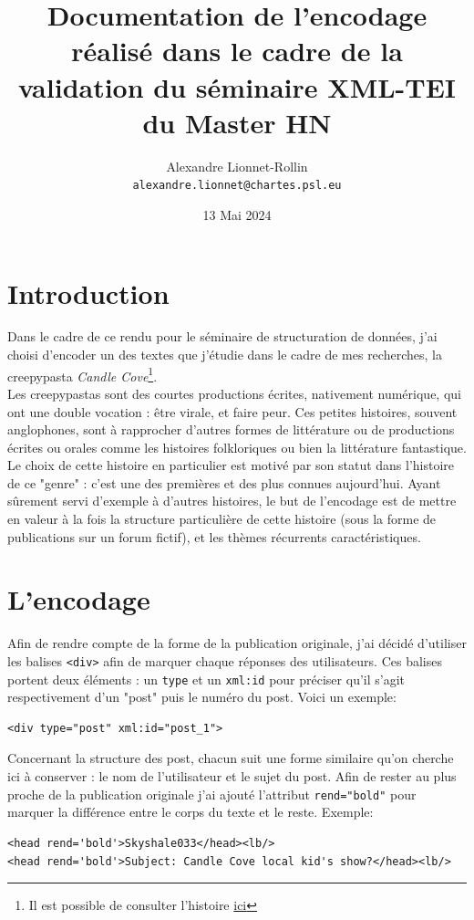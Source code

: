 \documentclass[onecolumn,12pt]{article}
\title{Documentation de l'encodage réalisé dans le cadre de la validation du séminaire XML-TEI du Master HN}
\author{Alexandre Lionnet-Rollin \\ \texttt{alexandre.lionnet@chartes.psl.eu}}
\date{13 Mai 2024}
\begin{document}
\maketitle

\section*{Introduction}

Dans le cadre de ce rendu pour le séminaire de structuration de données, j'ai choisi d'encoder un des textes que j'étudie dans le cadre de mes recherches, la creepypasta \emph{Candle Cove}\footnote{Il est possible de consulter l'histoire \href{http://ichorfalls.chainsawsuit.com/}{ici}}. \\
Les creepypastas sont des courtes productions écrites, nativement numérique, qui ont une double vocation : être virale, et faire peur. Ces petites histoires, souvent anglophones, sont à rapprocher d'autres formes de littérature ou de productions écrites ou orales comme les histoires folkloriques ou bien la littérature fantastique. \\
Le choix de cette histoire en particulier est motivé par son statut dans l'histoire de ce "genre" : c'est une des premières et des plus connues aujourd'hui. Ayant sûrement servi d'exemple à d'autres histoires, le but de l'encodage est de mettre en valeur à la fois la structure particulière de cette histoire (sous la forme de publications sur un forum fictif), et les thèmes récurrents caractéristiques.  \\

\section{L'encodage}

\par
Afin de rendre compte de la forme de la publication originale, j'ai décidé d'utiliser les balises \texttt{<div>} afin de marquer chaque réponses des utilisateurs. Ces balises portent deux éléments : un \texttt{type} et un \texttt{xml:id} pour préciser qu'il s'agit respectivement d'un "post" puis le numéro du post. Voici un exemple:  
\begin{verbatim}
<div type="post" xml:id="post_1">
\end{verbatim}

Concernant la structure des post, chacun suit une forme similaire qu'on cherche ici à conserver : le nom de l'utilisateur et le sujet du post. Afin de rester au plus proche de la publication originale j'ai ajouté l'attribut \texttt{rend="bold"} pour marquer la différence entre le corps du texte et le reste. Exemple: 
\begin{verbatim}
<head rend='bold'>Skyshale033</head><lb/>
<head rend='bold'>Subject: Candle Cove local kid's show?</head><lb/>
\end{verbatim}
\end{document}
